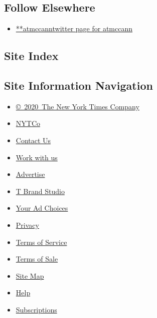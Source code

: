 \hypertarget{follow-elsewhere}{%
\subsection{Follow Elsewhere}\label{follow-elsewhere}}

\begin{itemize}
\tightlist
\item
  \href{https://twitter.com/atmccann}{**atmccanntwitter page for
  atmccann}
\end{itemize}

\hypertarget{site-index}{%
\subsection{Site Index}\label{site-index}}

\hypertarget{site-information-navigation}{%
\subsection{Site Information
Navigation}\label{site-information-navigation}}

\begin{itemize}
\tightlist
\item
  \href{https://help.nytimes.com/hc/en-us/articles/115014792127-Copyright-notice}{©~2020~The
  New York Times Company}
\end{itemize}

\begin{itemize}
\tightlist
\item
  \href{https://www.nytco.com/}{NYTCo}
\item
  \href{https://help.nytimes.com/hc/en-us/articles/115015385887-Contact-Us}{Contact
  Us}
\item
  \href{https://www.nytco.com/careers/}{Work with us}
\item
  \href{https://nytmediakit.com/}{Advertise}
\item
  \href{http://www.tbrandstudio.com/}{T Brand Studio}
\item
  \href{https://www.nytimes.com/privacy/cookie-policy\#how-do-i-manage-trackers}{Your
  Ad Choices}
\item
  \href{https://www.nytimes.com/privacy}{Privacy}
\item
  \href{https://help.nytimes.com/hc/en-us/articles/115014893428-Terms-of-service}{Terms
  of Service}
\item
  \href{https://help.nytimes.com/hc/en-us/articles/115014893968-Terms-of-sale}{Terms
  of Sale}
\item
  \href{https://spiderbites.nytimes.com}{Site Map}
\item
  \href{https://help.nytimes.com/hc/en-us}{Help}
\item
  \href{https://www.nytimes.com/subscription?campaignId=37WXW}{Subscriptions}
\end{itemize}
